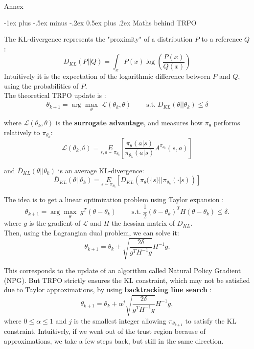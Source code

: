 \documentclass[10pt,landscape]{article}
\makeatletter
\renewcommand{\section}{\@startsection{section}{1}{0mm}%
                                {-1ex plus -.5ex minus -.2ex}%
                                {0.5ex plus .2ex}%
                                {\normalfont\large\bfseries}}
\makeatother
\begin{document}
\begin{multicols}{3}

\begin{center}
     \Large{Annex} \\
\end{center}


\section{Maths behind TRPO}

The KL-divergence represents the "proximity" of a distribution $P$ to a reference $Q$ :
$$ D_{KL}(P || Q) = \int_x P(x) \log \left ( \frac{P(x)}{Q(x)} \right )$$
Intuitively it is the expectation of the logarithmic difference between $P$ and $Q$, using the probabilities of $P$.\\
\medskip
The theoretical TRPO update is :
$$\theta_{k+1} = \arg \max_{\theta} \; \mathcal{L}(\theta_k, \theta) \;\;\;\;\;\;\;\;
     \text{s.t.} \;  \overline{D}_{KL}(\theta || \theta_k) \leq \delta $$

where $\mathcal{L}(\theta_k, \theta)$ is the \textbf{surrogate advantage}, and measures how $\pi_\theta$ performs relatively to $\pi_{\theta_k}$:
$$ {\mathcal L}(\theta_k, \theta) = \underset{s,a \sim \pi_{\theta_k}}{E} \left [
    \frac{\pi_{\theta}(a|s)}{\pi_{\theta_k}(a|s)} A^{\pi_{\theta_k}}(s,a) \right ] $$

and $\overline{D}_{KL}(\theta || \theta_k)$ is an average KL-divergence:
$$ \overline{D}_{KL}(\theta || \theta_k) = \underset{s \sim \pi_{\theta_k}}{E} \left [
    D_{KL}\left(\pi_{\theta}(\cdot|s) || \pi_{\theta_k} (\cdot|s) \right) \right ] $$

The idea is to get a linear optimization problem using Taylor expansion :
$$ \theta_{k+1} = \arg \max_{\theta} \; g^T (\theta - \theta_k) \;\;\;\;\;\;\;\;
\text{s.t.} \; \frac{1}{2} (\theta - \theta_k)^T H (\theta - \theta_k) \leq \delta. $$
where $g$ is the gradient of $\mathcal{L}$ and $H$ the hessian matrix of $\overline{D}_{KL}$.\\

Then, using the Lagrangian dual problem, we can solve it:
$$ \theta_{k+1} = \theta_k + \sqrt{\frac{2 \delta}{g^T H^{-1} g}} H^{-1} g. $$

This corresponds to the update of an algorithm called Natural Policy Gradient (NPG). But TRPO strictly ensures the KL constraint, which may not be satisfied due to Taylor approximations, by using \textbf{backtracking line search} :
$$ \theta_{k+1} = \theta_k + \alpha^j \sqrt{\frac{2 \delta}{g^T H^{-1} g}} H^{-1} g, $$
where $0 \leqslant \alpha \leqslant 1$ and $j$ is the smallest integer allowing $\pi_{\theta_{k+1}}$ to satisfy the KL constraint. Intuitively, if we went out of the trust region because of approximations, we take a few steps back, but still in the same direction.\\
\medskip


\end{multicols}
\end{document}
